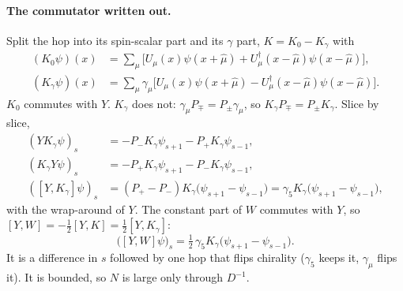 \documentclass[11pt,a4paper]{article}
\numberwithin{equation}{section}
\newcommand{\dg}{^{\dagger}}
\newcommand{\Pp}{P_{+}}
\newcommand{\Pm}{P_{-}}
\begin{document}
\paragraph{The commutator written out.} Split the hop into its spin-scalar part and its
$\gamma$ part, $K=K_0-K_\gamma$ with
\begin{align}
(K_0\psi)(x)&=\sum_\mu\big[U_\mu(x)\psi(x+\hat\mu)+U_\mu\dg(x-\hat\mu)\psi(x-\hat\mu)\big],\nonumber\\
(K_\gamma\psi)(x)&=\sum_\mu\gamma_\mu\big[U_\mu(x)\psi(x+\hat\mu)-U_\mu\dg(x-\hat\mu)\psi(x-\hat\mu)\big].
\end{align}
$K_0$ commutes with $Y$. $K_\gamma$ does not: $\gamma_\mu P_\mp=P_\pm\gamma_\mu$, so
$K_\gamma P_\mp=P_\pm K_\gamma$. Slice by slice,
\begin{align}
(YK_\gamma\psi)_s&=-\Pm K_\gamma\psi_{s+1}-\Pp K_\gamma\psi_{s-1},\nonumber\\
(K_\gamma Y\psi)_s&=-\Pp K_\gamma\psi_{s+1}-\Pm K_\gamma\psi_{s-1},\nonumber\\
([Y,K_\gamma]\psi)_s&=(\Pp-\Pm)K_\gamma\big(\psi_{s+1}-\psi_{s-1}\big)=\gamma_5K_\gamma\big(\psi_{s+1}-\psi_{s-1}\big),
\end{align}
with the wrap-around of $Y$. The constant part of $W$ commutes with $Y$, so
$[Y,W]=-\frac12[Y,K]=\frac12[Y,K_\gamma]$:
\begin{equation}
\big([Y,W]\psi\big)_s=\tfrac12\,\gamma_5K_\gamma\big(\psi_{s+1}-\psi_{s-1}\big).
\label{eq:YWcomm}
\end{equation}
It is a difference in $s$ followed by one hop that flips chirality ($\gamma_5$ keeps it,
$\gamma_\mu$ flips it). It is bounded, so $N$ is large only through $D^{-1}$.
\end{document}
